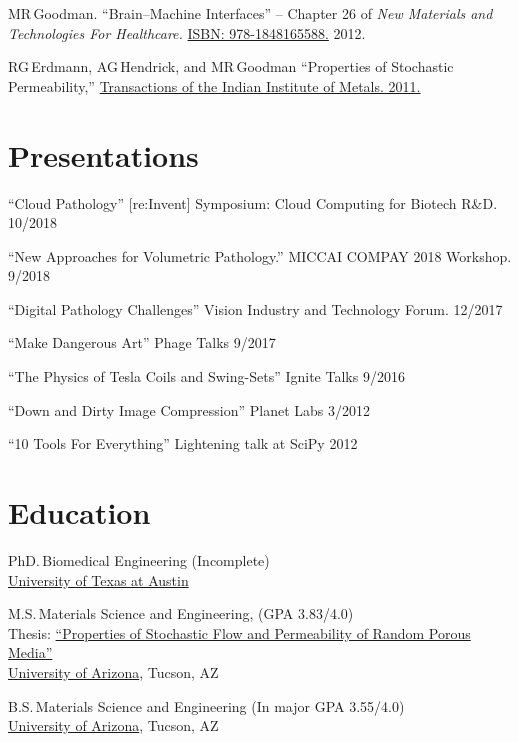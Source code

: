 \documentclass{res}
\begin{document}
\begin{resume}
  MR\,Goodman.
  ``Brain--Machine Interfaces'' -- Chapter 26 of \textit{New Materials and Technologies For Healthcare.}
  \href{http://amzn.com/1848165587}{ISBN: 978-1848165588.} 2012.

  RG\,Erdmann, AG\,Hendrick, and MR\,Goodman
  ``Properties of Stochastic Permeability,''
  \href{http://dx.doi.org/10.1007/s12666-009-0038-5}{Transactions of the Indian Institute of Metals. 2011.}

\section{Presentations}
  ``Cloud Pathology''
  [re:Invent] Symposium: Cloud Computing for Biotech R\&D. \hfill 10/2018

  ``New Approaches for Volumetric Pathology.''
  MICCAI COMPAY 2018 Workshop. \hfill 9/2018

  ``Digital Pathology Challenges''
  Vision Industry and Technology Forum. \hfill 12/2017

  ``Make Dangerous Art''
  Phage Talks \hfill 9/2017

  ``The Physics of Tesla Coils and Swing-Sets''
  Ignite Talks \hfill 9/2016

  ``Down and Dirty Image Compression''
  Planet Labs \hfill 3/2012

  ``10 Tools For Everything''
  Lightening talk at SciPy \hfill 2012

\section{Education}
  PhD.\,Biomedical Engineering (Incomplete) \\
  \href{https://www.bme.utexas.edu/}{University of Texas at Austin}
  
  M.S.\,Materials Science and Engineering,
  (GPA 3.83/4.0) \\
  Thesis: \href{http://hdl.handle.net/10150/193422}{``Properties of Stochastic Flow and Permeability of Random Porous Media''} \\
  \href{https://mse.engineering.arizona.edu/}{University of Arizona}, Tucson, AZ
  
  B.S.\,Materials Science and Engineering (In major GPA 3.55/4.0) \\
  \href{https://mse.engineering.arizona.edu/}{University of Arizona}, Tucson, AZ


\end{resume}
\end{document}
